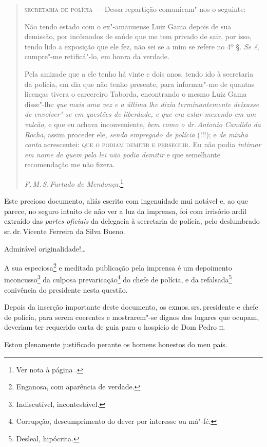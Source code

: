 \begin{quote}
\textsc{secretaria de polícia} --- Dessa repartição comunicam"-nos o seguinte:

Não tendo estado com o ex"-amanuense Luiz Gama depois de sua demissão,
por incômodos de saúde que me tem privado de sair, por isso, tendo lido
a exposição que ele fez, não sei se a mim se refere no 4º §. \emph{Se
é}, cumpre"-me retificá"-lo, em honra da verdade.

Pela amizade que a ele tenho há vinte e dois anos, tendo ido à
secretaria da polícia, em dia que não tenho presente, para informar"-me
de quantas licenças tivera o carcereiro Taborda, encontrando o mesmo
Luiz Gama disse"-lhe \emph{que mais uma vez e a última lhe dizia
terminantemente deixasse de envolver"-se em questões de liberdade, e que
era estar mexendo em um vulcão,} e que eu achava inconveniente\emph{,
bem como o dr.\,Antonio Candido da Rocha}, assim proceder ele,
\emph{sendo empregado de polícia} (!!!); e \emph{de minha conta}
acrescentei: \textsc{que o podiam demitir e perseguir}. Eu não podia
\emph{intimar em nome de quem pela lei não podia demitir} e que
semelhante recomendação me não fizera.

\hfill\emph{F.\,M.\,S.\,Furtado de Mendonça}.\footnote{Ver nota à página \pageref{fmfm}.}
\end{quote}

Este precioso documento, aliás escrito com ingenuidade mui notável e, ao
que parece, no seguro intuito de não ver a luz da imprensa, foi com
irrisório ardil extraído das \emph{partes oficiais} da delegacia à
secretaria de polícia, pelo deslumbrado sr.\,dr.\,Vicente Ferreira da
Silva Bueno.

Admirável originalidade!\ldots{}

A sua especiosa\footnote{Enganosa, com aparência de verdade.} e
meditada publicação pela imprensa é um depoimento inconcusso\footnote{
  Indiscutível, incontestável.} da culposa prevaricação\footnote{
  Corrupção, descumprimento do dever por interesse ou má"-fé.} do chefe
de polícia, e da refalsada\footnote{Desleal, hipócrita.}
conivência do presidente
nesta questão.

Depois da inserção importante deste documento, os exmos.\,srs.\,presidente
e chefe de polícia, para serem coerentes e mostrarem"-se dignos dos
lugares que ocupam, deveriam ter requerido carta de guia para o hospício
de Dom Pedro \textsc{ii}.

Estou plenamente justificado perante os homens honestos do meu país.

